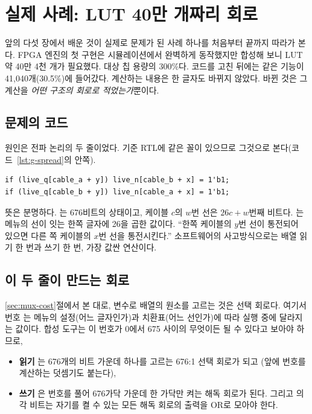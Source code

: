 \chapter{실제 사례: LUT 40만 개짜리 회로}\label{ch:lesson}

앞의 다섯 장에서 배운 것이 실제로 문제가 된 사례 하나를 처음부터 끝까지 따라가 본다. FPGA 엔진의 첫 구현은
시뮬레이션에서 완벽하게 동작했지만 합성해 보니 LUT 약 40만 4천 개가 필요했다. 대상 칩 용량의 300\%다.
코드를 고친 뒤에는 같은 기능이 41,040개(30.5\%)에 들어갔다. 계산하는 내용은 한 글자도 바뀌지 않았다.
바뀐 것은 그 계산을 \emph{어떤 구조의 회로로 적었는가}뿐이다.

\section{문제의 코드}

원인은 전파 논리의 두 줄이었다. 기준 RTL에 같은 꼴이 있으므로 그것으로 본다(코드~\ref{lst:g-spread}의 안쪽).

\begin{lstlisting}[language=SV,numbers=none]
if (live_q[cable_a + y]) live_n[cable_b + x] = 1'b1;
if (live_q[cable_b + y]) live_n[cable_a + x] = 1'b1;
\end{lstlisting}

뜻은 분명하다. 는 676비트의 상태이고, 케이블 $c$의 $w$번 선은 $26c + w$번째 비트다.
는 메뉴의 선이 잇는 한쪽 글자에 26을 곱한 값이다. ``한쪽 케이블의 $y$번 선이 통전되어 있으면
다른 쪽 케이블의 $x$번 선을 통전시킨다.'' 소프트웨어의 사고방식으로는 배열 읽기 한 번과 쓰기 한 번,
가장 값싼 연산이다.

\section{이 두 줄이 만드는 회로}

\Why \ref{sec:mux-cost}절에서 본 대로, 변수로 배열의 원소를 고르는 것은 선택 회로다. 여기서 번호
는 메뉴의 설정(어느 글자인가)과 치환표(어느 선인가)에 따라 실행 중에 달라지는 값이다.
합성 도구는 이 번호가 0에서 675 사이의 무엇이든 될 수 있다고 보아야 하므로,

\begin{itemize}
\item \textbf{읽기} 는 676개의 비트 가운데 하나를 고르는 676:1 선택 회로가 되고
(앞에 번호를 계산하는 덧셈기도 붙는다),
\item \textbf{쓰기} 은 번호를 풀어 676가닥 가운데 한 가닥만 켜는 해독 회로가
된다. 그리고 의 각 비트는 자기를 켤 수 있는 모든 해독 회로의 출력을 OR로 모아야 한다.
\end{itemize}

